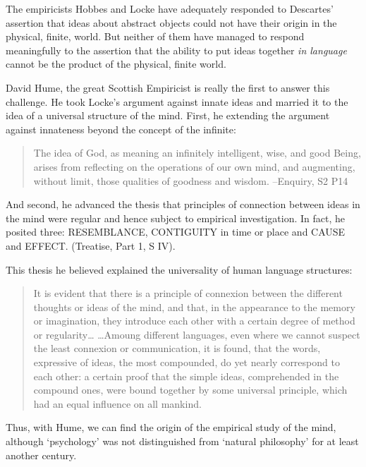 The empiricists Hobbes and Locke have adequately responded to Descartes' assertion that ideas about abstract objects could not have their origin in the physical, finite, world. But neither of them have managed to respond meaningfully to the assertion that the ability to put ideas together \emph{in language} cannot be the product of the physical, finite world.

David Hume, the great Scottish Empiricist is really the first to answer this challenge. He took Locke's argument against innate ideas and married it to the idea of a universal structure of the mind. First, he extending the argument against innateness beyond the concept of the infinite:

\begin{quote}

The idea of God, as meaning an infinitely intelligent, wise, and good Being, arises from reflecting on the operations of our own mind, and augmenting, without limit, those qualities of goodness and wisdom. --Enquiry, S2 P14
\end{quote}

And second, he advanced the thesis that principles of connection between ideas in the mind were regular and hence subject to empirical investigation. In fact, he posited three: RESEMBLANCE, CONTIGUITY in time or place and CAUSE and EFFECT. (Treatise, Part 1, S IV). 

This thesis he believed explained the universality of human language structures:

\begin{quote}

It is evident that there is a principle of connexion between the different thoughts or ideas of the mind, and that, in the appearance to the memory or imagination, they introduce each other with a certain degree of method or regularity{\ldots} {\ldots}Amoung different languages, even where we cannot suspect the least connexion or communication, it is found, that the words, expressive of ideas, the most compounded, do yet nearly correspond to each other: a certain proof that the simple ideas, comprehended in the compound ones, were bound together by some universal principle, which had an equal influence on all mankind.
\end{quote}

Thus, with Hume, we can find the origin of the empirical study of the mind, although `psychology' was not distinguished from `natural philosophy' for at least another century.

